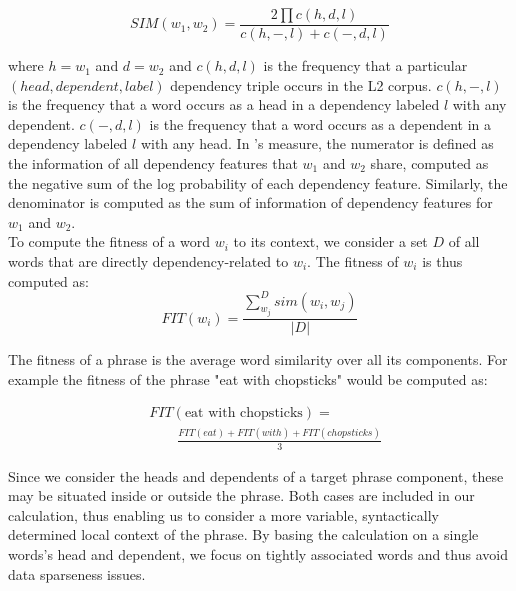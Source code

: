 \documentclass[11pt]{article}
\begin{document}
\begin{equation}
SIM(w_1,w_2) = \frac{2 \prod c(h,d,l)} 
{c(h,-,l) + c(-,d,l)}
\end{equation}

\noindent
where $h=w_1$ and $d=w_2$ and 
$c(h,d,l)$ is the frequency that a particular $(head, dependent, label)$ dependency triple occurs in the L2 corpus. $c(h,-,l)$ is the frequency that a word occurs as a head in a dependency labeled $l$ with any dependent. $c(-,d,l)$ is the frequency that a word occurs as a dependent in a dependency labeled $l$  with any head. 
In \cite{lin:98}'s measure, the numerator is defined as the information of all dependency features that $w_1$ and $w_2$ share, computed as the negative sum of the log probability of each dependency feature. Similarly, the denominator is computed as the sum of information of dependency features for $w_1$ and $w_2$. \\

To compute the fitness of a word $w_i$ to its context, we consider a set $D$ of all words that are directly dependency-related to $w_i$. The fitness of $w_i$ is thus computed as:\\
\begin{equation}
FIT(w_i) =  \frac {  \sum_{w_j}^{D} sim(w_i,w_j) } {  |D|}
\end{equation}

The fitness of a phrase is the average word similarity over all its components. For example the fitness of the phrase "eat with chopsticks" would be computed as:

\begin{align}
& FIT(\mbox{eat with chopsticks}) = \nonumber \\
 & \qquad \frac{FIT(eat) + FIT(with) + FIT(chopsticks)}{3}
\end{align}

Since we consider the heads and dependents of a target phrase component, these may be situated  inside or outside the phrase. Both cases are included in our calculation, thus enabling us to consider a more variable, syntactically determined local context of the phrase.
By basing the calculation on a  single words's head and dependent, we focus on  tightly associated words and thus avoid data sparseness issues.
\end{document}
